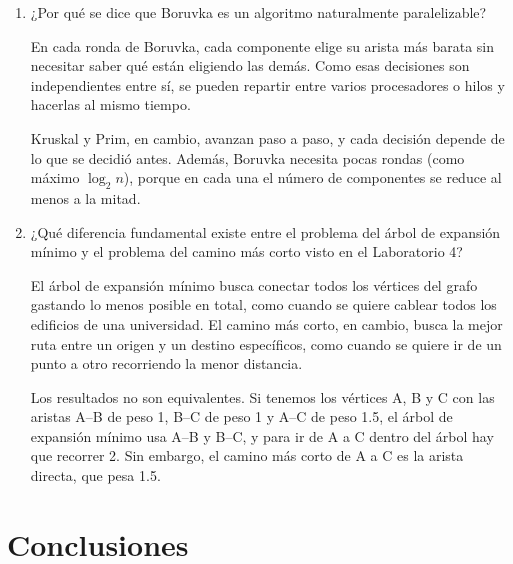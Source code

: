 \documentclass{article}
\begin{document}
\begin{enumerate}
	Por ejemplo, en un triángulo donde las tres aristas pesan 1, se puede dejar fuera cualquiera de ellas, y así hay tres árboles posibles. Los tres pesan 2. Lo que nunca cambia es el peso total, que siempre es el mínimo.

	\item ¿Por qué se dice que Boruvka es un algoritmo naturalmente paralelizable?

	En cada ronda de Boruvka, cada componente elige su arista más barata sin necesitar saber qué están eligiendo las demás. Como esas decisiones son independientes entre sí, se pueden repartir entre varios procesadores o hilos y hacerlas al mismo tiempo.

	Kruskal y Prim, en cambio, avanzan paso a paso, y cada decisión depende de lo que se decidió antes. Además, Boruvka necesita pocas rondas (como máximo $\log_2 n$), porque en cada una el número de componentes se reduce al menos a la mitad.

	\item ¿Qué diferencia fundamental existe entre el problema del árbol de expansión mínimo y el problema del camino más corto visto en el Laboratorio 4?

	El árbol de expansión mínimo busca conectar todos los vértices del grafo gastando lo menos posible en total, como cuando se quiere cablear todos los edificios de una universidad. El camino más corto, en cambio, busca la mejor ruta entre un origen y un destino específicos, como cuando se quiere ir de un punto a otro recorriendo la menor distancia.

	Los resultados no son equivalentes. Si tenemos los vértices A, B y C con las aristas A--B de peso 1, B--C de peso 1 y A--C de peso 1.5, el árbol de expansión mínimo usa A--B y B--C, y para ir de A a C dentro del árbol hay que recorrer 2. Sin embargo, el camino más corto de A a C es la arista directa, que pesa 1.5.
	\end{enumerate}

\section{Conclusiones}
\end{document}
